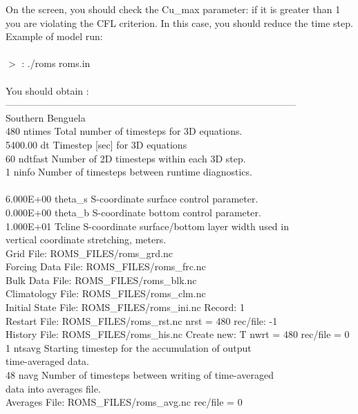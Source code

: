 On the screen, you should check the Cu\_max parameter: if it is greater than 1 you
are violating the CFL criterion. In this case, you should reduce the time step.
\\
Example of model run:\\
\\
$>$ : ./roms roms.in
\\\\
You should obtain :\\
------------------------------------------------------------------------------------------\\
Southern Benguela\\
480  ntimes   Total number of timesteps for 3D equations.\\
5400.00  dt       Timestep [sec] for 3D equations\\
60  ndtfast  Number of 2D timesteps within each 3D step.\\
1  ninfo    Number of timesteps between runtime diagnostics.\\
\\
6.000E+00  theta\_s  S-coordinate surface control parameter.\\
0.000E+00  theta\_b  S-coordinate bottom control parameter.\\
1.000E+01  Tcline   S-coordinate surface/bottom layer width used in\\
vertical coordinate stretching, meters.\\
Grid File:  ROMS\_FILES/roms\_grd.nc\\
Forcing Data File:  ROMS\_FILES/roms\_frc.nc\\
Bulk Data File:  ROMS\_FILES/roms\_blk.nc\\
Climatology File:  ROMS\_FILES/roms\_clm.nc\\
Initial State File:  ROMS\_FILES/roms\_ini.nc    Record:  1\\
Restart File:  ROMS\_FILES/roms\_rst.nc    nrst =   480    rec/file:   -1\\
History File:  ROMS\_FILES/roms\_his.nc  Create new: T  nwrt = 480  rec/file =  0\\
1  ntsavg      Starting timestep for the accumulation of output\\
time-averaged data.\\
48  navg        Number of timesteps between writing of time-averaged\\
data into averages file.\\
Averages File:  ROMS\_FILES/roms\_avg.nc rec/file =  0\\
